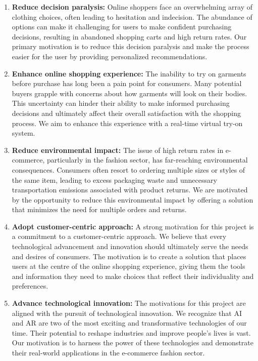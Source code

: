	\begin{enumerate}
		\item \textbf{Reduce decision paralysis:} Online shoppers face an overwhelming array of clothing choices, often leading to hesitation and indecision. The abundance of options can make it challenging for users to make confident purchasing decisions, resulting in abandoned shopping carts and high return rates. Our primary motivation is to reduce this decision paralysis and make the process easier for the user by providing personalized recommendations.
		\item \textbf{Enhance online shopping experience:} The inability to try on garments before purchase has long been a pain point for consumers. Many potential buyers grapple with concerns about how garments will look on their bodies. This uncertainty can hinder their ability to make informed purchasing decisions and ultimately affect their overall satisfaction with the shopping process. We aim to enhance this experience with a real-time virtual try-on system.
		\item \textbf{Reduce environmental impact:} The issue of high return rates in e-commerce, particularly in the fashion sector, has far-reaching environmental consequences. Consumers often resort to ordering multiple sizes or styles of the same item, leading to excess packaging waste and unnecessary transportation emissions associated with product returns. We are motivated by the opportunity to reduce this environmental impact by offering a solution that minimizes the need for multiple orders and returns.
		\item \textbf{Adopt customer-centric approach:} A strong motivation for this project is a commitment to a customer-centric approach. We believe that every technological advancement and innovation should ultimately serve the needs and desires of consumers. The motivation is to create a solution that places users at the centre of the online shopping experience, giving them the tools and information they need to make choices that reflect their individuality and preferences.
		\item \textbf{Advance technological innovation:} The motivations for this project are aligned with the pursuit of technological innovation. We recognize that AI and AR are two of the most exciting and transformative technologies of our time. Their potential to reshape industries and improve people's lives is vast. Our motivation is to harness the power of these technologies and demonstrate their real-world applications in the e-commerce fashion sector.
	\end{enumerate}
